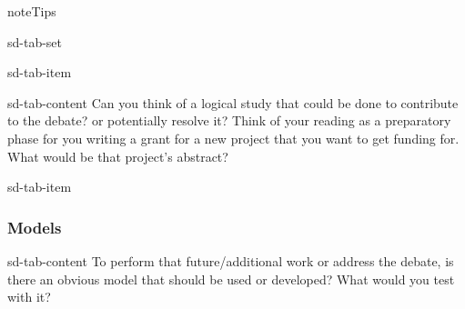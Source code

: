 \documentclass[letterpaper,10pt,english]{jupyterBook}
\begin{document}
\begin{sphinxadmonition}{note}{Tips}
\begin{sphinxuseclass}{sd-tab-set}
\begin{sphinxuseclass}{sd-tab-item}
\begin{sphinxuseclass}{sd-tab-content}
\sphinxAtStartPar
Can you think of a logical study that could be done to contribute to the debate? or potentially resolve it? Think of your reading as a preparatory phase for you writing a grant for a new project that you want to get funding for. What would be that project’s abstract?

\end{sphinxuseclass}
\end{sphinxuseclass}
\begin{sphinxuseclass}{sd-tab-item}\subsubsection*{Models}

\begin{sphinxuseclass}{sd-tab-content}
\sphinxAtStartPar
To perform that future/additional work or address the debate, is there an obvious model that should be used or developed? What would you test with it?

\end{sphinxuseclass}
\end{sphinxuseclass}
\end{sphinxuseclass}\end{sphinxadmonition}

\sphinxstepscope
\end{document}
